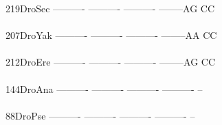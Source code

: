 \documentclass[11pt,twoside,reqno,a4paper]{article}
\begin{document}
{219\hspace*{2\charwidth}DroSec	----------	----------	----------	--------AG	CC\\
\hspace*{5\charwidth}\hspace*{7\charwidth}\hspace*{1\charwidth}\hspace*{1\charwidth}\hspace*{1\charwidth}\hspace*{1\charwidth}\\
207\hspace*{2\charwidth}DroYak	----------	----------	----------	--------AA	CC\\
\hspace*{5\charwidth}\hspace*{7\charwidth}\hspace*{1\charwidth}\hspace*{1\charwidth}\hspace*{1\charwidth}\hspace*{1\charwidth}\\
212\hspace*{2\charwidth}DroEre	----------	----------	----------	--------AG	CC\\
\hspace*{5\charwidth}\hspace*{7\charwidth}\hspace*{1\charwidth}\hspace*{1\charwidth}\hspace*{1\charwidth}\hspace*{1\charwidth}\\
144\hspace*{2\charwidth}DroAna	----------	----------	----------	----------	--\\
\hspace*{5\charwidth}\hspace*{7\charwidth}\hspace*{1\charwidth}\hspace*{1\charwidth}\hspace*{1\charwidth}\hspace*{1\charwidth}\\
88\hspace*{3\charwidth}DroPse	----------	----------	----------	----------	--\\
\hspace*{5\charwidth}\hspace*{7\charwidth}\hspace*{1\charwidth}\hspace*{1\charwidth}\hspace*{1\charwidth}\hspace*{1\charwidth}\\
}
\end{document}
